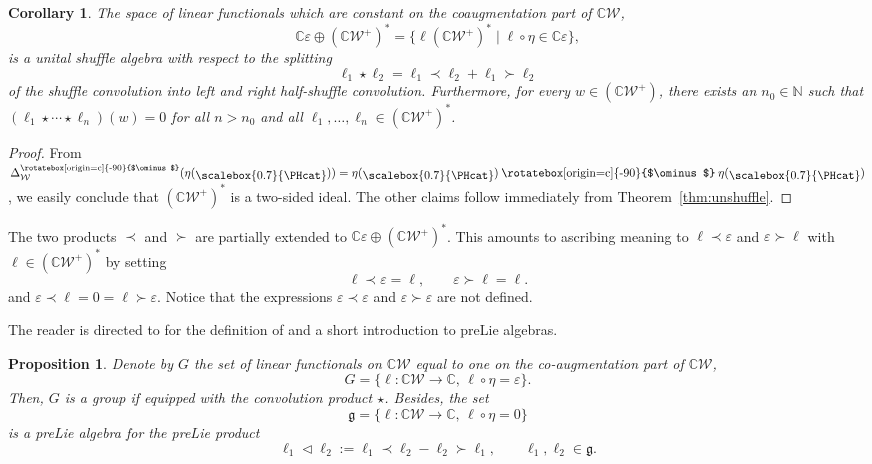 \documentclass[pdftex]{sigma}
\newcommand\overt{\mathbin{\text{\rotatebox[origin=c]{-90}{$\ominus$}}}}
\newcommand{\linearspan}[1]{{\CC #1}}
\newcommand\IWc{\mathcal{W}}
\newcommand{\vcp}{\Delta^{\overt}}
\newcommand\vcpS{\vcp_{\IWc}}
\def\CC{\mathbb{C}}
\def\CIWc{{\linearspan{\IWc}}}
\newcommand{\Singleton}{\raisebox{-2pt}{\scalebox{0.7}{\PHcat}}}
\numberwithin{equation}{section}
\newtheorem{Proposition}[Theorem]{Proposition}
\newtheorem{Corollary}[Theorem]{Corollary}
\begin{document}
\begin{Corollary}The space of linear functionals which are constant on the coaugmentation part of $\CIWc$,
	\[\mathbb C\varepsilon \oplus (\linearspan{\IWc^{+}})^{\ast}=\{\ell (\linearspan{\IWc^{+}})^{\ast}\mid \ell\circ\eta\in\mathbb C\varepsilon\},\] is a unital shuffle algebra with respect to the splitting
	\[\ell_1\star\ell_2=\ell_1\prec \ell_2 + \ell_1\succ\ell_2\]
	of the shuffle convolution into left and right half-shuffle convolution.
Furthermore, for every $w\in (\linearspan{\IWc^{+}})$, there exists an $n_0\in\mathbb N$ such that $(\ell_1\star\cdots\star \ell_n)(w)=0$ for all $n>n_0$ and all $\ell_1,\dots, \ell_n\in (\linearspan{\IWc^{+}})^\ast$.
\end{Corollary}
\begin{proof}
 From $\vcpS(\eta(\Singleton))=\eta(\Singleton)\overt\eta(\Singleton)$, we easily conclude that $(\linearspan{\IWc^{+}})^*$ is a two-sided ideal. The other claims follow immediately from Theorem~\ref{thm:unshuffle}.
\end{proof}

The two products $\prec$ and $\succ$ are partially extended to $\mathbb C\varepsilon \oplus (\linearspan{\IWc^{+}})^{\ast}$.
This amounts to ascribing meaning to $\ell \prec \varepsilon$ and $\varepsilon \succ \ell$ with $\ell \in {(\linearspan{\IWc}^{+})}^{\ast}$ by setting
\begin{equation*}
	\ell \prec \varepsilon = \ell,\qquad \varepsilon \succ \ell = \ell.
\end{equation*}
and $\varepsilon \prec \ell = 0 = \ell \succ \varepsilon$.
Notice that the expressions $\varepsilon \prec \varepsilon$ and $\varepsilon \succ \varepsilon$ are not defined.

The reader is directed to \cite{manchon2011short} for the definition of and a short introduction to preLie algebras.
\begin{Proposition}\label{prop:group-G-and-preLie-g}
	Denote by $G$ the set of linear functionals on $\linearspan{\IWc}$ equal to one on the co-augmentation part of $\linearspan{\IWc}$,
	\begin{equation*}
		G = \{\ell \colon \linearspan{\IWc}\to\CC,\,\ell \circ \eta=\varepsilon\}.
	\end{equation*}
	Then, $G$ is a group if equipped with the convolution product $\star$.
	 Besides, the set
	\begin{equation*}
		\mathfrak{g} = \{ \ell \colon \linearspan{\IWc} \to \CC,\, \ell \circ \eta = 0\}
	\end{equation*}
	is a preLie algebra for the preLie product
	\begin{equation}\label{eq:preLie-from-shuffle}
		\ell_1 \vartriangleleft \ell_2 := \ell_1 \prec \ell_2 - \ell_2 \succ \ell_1,\qquad \ell_1,\ell_2\in\mathfrak{g}.
	\end{equation}
\end{Proposition}
\end{document}
